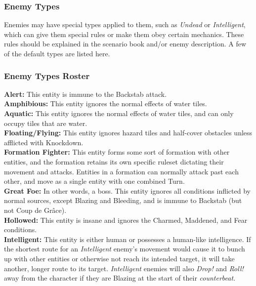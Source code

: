 \documentclass[12pt]{article}
\begin{document}
\begin{multicols*}{2}
\subsubsection{Enemy Types}
Enemies may have special types applied to them, such as \emph{Undead} or \emph{Intelligent}, which can give them special rules or make them obey certain mechanics. These rules should be explained in the scenario book and/or enemy description. A few of the default types are listed here.

\subsubsection*{Enemy Types Roster}
\textbf{Alert:} This entity is immune to the Backstab attack.\\

\textbf{Amphibious:} This entity ignores the normal effects of water tiles.\\

\textbf{Aquatic:} This entity ignores the normal effects of water tiles, and can only occupy tiles that are water.\\

\textbf{Floating/Flying:} This entity ignores hazard tiles and half-cover obstacles unless afflicted with Knockdown.\\

\textbf{Formation Fighter:} This entity forms some sort of formation with other entities, and the formation retains its own specific ruleset dictating their movement and attacks. Entities in a formation can normally attack past each other, and move as a single entity with one combined Turn.\\

\textbf{Great Foe:} In other words, a boss. This entity ignores all conditions inflicted by normal sources, except Blazing and Bleeding, and is immune to Backstab (but not Coup de Grâce).\\

\textbf{Hollowed:} This entity is insane and ignores the Charmed, Maddened, and Fear conditions.\\

\textbf{Intelligent:} This entity is either human or possesses a human-like intelligence. If the shortest route for an \emph{Intelligent} enemy’s movement would cause it to bunch up with other entities or otherwise not reach its intended target, it will take another, longer route to its target. \emph{Intelligent} enemies will also \emph{Drop!} and \emph{Roll!} away from the character if they are Blazing at the start of their \emph{counterbeat.}\\


\end{multicols*}
\end{document}
